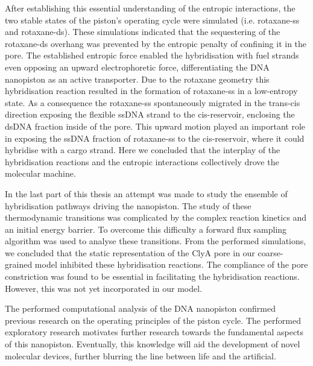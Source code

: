 After establishing this essential understanding of the entropic interactions, the two
stable states of the piston's operating cycle were simulated (i.e. rotaxane-ss and
rotaxane-ds). These simulations indicated that the sequestering of the rotaxane-ds
overhang was prevented by the entropic penalty of confining it in the pore.
The established entropic force enabled the hybridisation with fuel strands even opposing
an upward electrophoretic force, differentiating the DNA nanopiston as an active
transporter. Due to the rotaxane geometry this hybridisation reaction resulted in the
formation of rotaxane-ss in a low-entropy state. As a consequence the rotaxane-ss
spontaneously migrated in the trans-cis direction exposing the flexible ssDNA strand to
the cis-reservoir, enclosing the dsDNA fraction inside of the pore. This
upward motion played an important role in exposing the ssDNA fraction of rotaxane-ss to
the cis-reservoir, where it could hybridise with a cargo strand. Here we concluded that
the interplay of the hybridisation reactions and the entropic interactions collectively
drove the molecular machine.

In the last part of this thesis an attempt was made to study the ensemble of
hybridisation pathways driving the nanopiston. The study of
these thermodynamic transitions was complicated by the complex reaction kinetics and an
initial energy barrier. To overcome this difficulty a forward flux sampling algorithm
was used to analyse these transitions. From the performed simulations, we concluded that
the static representation of the ClyA pore in our coarse-grained model inhibited these
hybridisation reactions. The compliance of the pore constriction was found to be
essential in facilitating the hybridisation reactions. However, this was not yet
incorporated in our model.

The performed computational analysis of the DNA nanopiston confirmed previous research on
the operating principles of the piston cycle. The performed exploratory research
motivates further research towards the fundamental aspects of this nanopiston.
Eventually, this knowledge will aid the development of novel molecular devices, further
blurring the line between life and the artificial.
